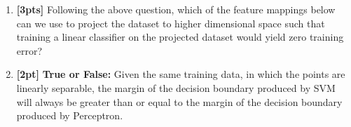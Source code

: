 \documentclass[12pt]{article}
\renewcommand{\circle}{\tikz\draw[black] (0,0) circle (1ex);}
\begin{document}
\begin{enumerate}
    \item \textbf{[3pts]} Following the above question, which of the feature mappings below can we use to project the dataset to higher dimensional space such that training a linear classifier on the projected dataset would yield zero training error?

    
    
    \item \textbf{[2pt]} \textbf{True or False:} Given the same training data, in which the points are linearly separable, the margin of the decision boundary produced by SVM will always be greater than or equal to the margin of the decision boundary produced by Perceptron.
    
    
    
    
    

    
\end{enumerate}

    
    
\end{document}
